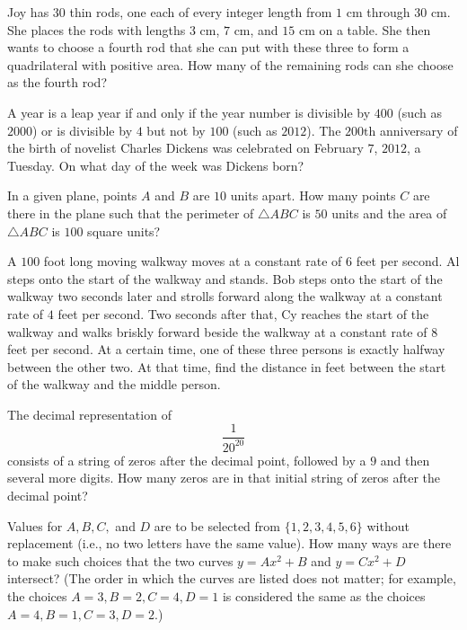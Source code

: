 \documentclass[mast]{lucky}
\begin{document}
\begin{prob}[AMC 10A 2017/10]{2}
Joy has $30$ thin rods, one each of every integer length from $1$ cm through $30$ cm. She places the rods with lengths $3$ cm, $7$ cm, and $15$ cm on a table. She then wants to choose a fourth rod that she can put with these three to form a quadrilateral with positive area. How many of the remaining rods can she choose as the fourth rod?
\end{prob}

\begin{prob}[AMC 12A 2012/9]{3}
A year is a leap year if and only if the year number is divisible by $400$ (such as $2000$) or is divisible by $4$ but not by $100$ (such as $2012$). The $200\text{th}$ anniversary of the birth of novelist Charles Dickens was celebrated on February $7$, $2012$, a Tuesday. On what day of the week was Dickens born?
\end{prob}

\begin{prob}[AMC 10B 2019/10]{3}
In a given plane, points $A$ and $B$ are $10$ units apart. How many points $C$ are there in the plane such that the perimeter of $\triangle ABC$ is $50$ units and the area of $\triangle ABC$ is $100$ square units?
\end{prob}

\begin{prob}[AIME I 2007/2]{3}
A $100$ foot long moving walkway moves at a constant rate of $6$ feet per second. Al steps onto the start of the walkway and stands. Bob steps onto the start of the walkway two seconds later and strolls forward along the walkway at a constant rate of $4$ feet per second. Two seconds after that, Cy reaches the start of the walkway and walks briskly forward beside the walkway at a constant rate of $8$ feet per second. At a certain time, one of these three persons is exactly halfway between the other two. At that time, find the distance in feet between the start of the walkway and the middle person.
\end{prob}

\begin{prob}[AMC 10B 2020/12]{3}
The decimal representation of\[\dfrac{1}{20^{20}}\]consists of a string of zeros after the decimal point, followed by a $9$ and then several more digits. How many zeros are in that initial string of zeros after the decimal point?
\end{prob}

\begin{prob}[AMC 10A 2021/15]{3}
Values for $A, B, C,$ and $D$ are to be selected from $\{1, 2, 3, 4, 5, 6 \}$ without replacement (i.e., no two letters have the same value). How many ways are there to make such choices that the two curves $y=Ax^2+B$ and $y=Cx^2+D$ intersect? (The order in which the curves are listed does not matter; for example, the choices $A=3, B=2, C=4, D=1$ is considered the same as the choices $A=4, B=1, C=3, D=2.$)
\end{prob}
\end{document}
